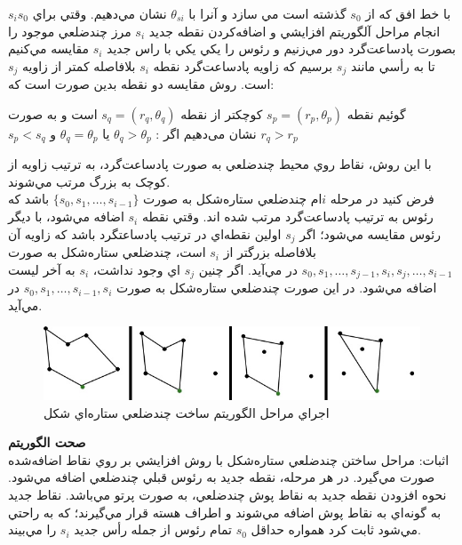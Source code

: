 \documentclass{book}
\begin{document}
$s_{i}s_{0}$
 با خط افق که از $s_{0}$ گذشته است مي سازد و آنرا با 
 $ \theta_{si}$
  نشان مي‌دهيم. وقتي براي انجام مراحل آلگوريتم افزايشي و اضافه‌کردن نقطه جديد
   $s_{i}$
  مرز چندضلعي موجود را بصورت پادساعت‌گرد دور مي‌زنيم و رئوس را يکي يکي با راس جديد 
  $s_{i}$
   مقايسه مي‌کنيم تا به رأسي مانند $s_{j}$ برسيم كه زاويه پادساعت‌گرد نقطه $s_{i}$ بلافاصله کمتر از زاويه $s_{j}$ است. روش مقايسه دو نقطه بدين صورت است که:
   \begin{center}
   	گوئیم نقطه
   	$s_{p}=(r_{p},\theta_{p})$
   	کوچکتر از نقطه
   		$s_{q}=(r_{q},\theta_{q})$
   		است و به صورت \\
   		$s_{p}<s_{q}$
   		نشان می‌دهیم اگر : 
   		$\theta_{q}>\theta_{p}$
   		یا
   		   		$\theta_{q}=\theta_{p}$
   		   		و
   		   		$r_{q}>r_{p}$
   		   		\\
   		   		   \end{center}
   		   		با اين روش، نقاط روي محيط چندضلعي به‌ صورت پادساعت‌گرد، به ترتيب زاويه از کوچک به بزرگ مرتب مي‌شوند. \\
   		   		
   		   		فرض کنيد در مرحله  $i$ام چندضلعي ستاره‌شكل به صورت
  $\{s_{0}, s_{1},\dots ,s_{i-1}\} $
   		   		   باشد که رئوس به ترتيب پادساعت‌گرد مرتب شده اند. وقتي نقطه 
   		   		   $s_{i}$
   		   		    اضافه مي‌شود، با ديگر رئوس مقايسه مي‌شود؛ اگر 
   		   		    $s_{j}$
   		   		     اولين نقطه‌اي در ترتيب پادساعتگرد باشد كه زاويه آن بلافاصله بزرگتر از 
   		   		     $s_{i}$
   		   		      است، چندضلعي ستاره‌شكل  به صورت 
   		$s_{0}, s_{1},\dots , s_{j-1}, s_{i}, s_{j}, \dots, s_{i-1}$
   		   		       در مي‌آيد. اگر چنين $s_{j}$ اي وجود نداشت، $s_{i}$ به آخر ليست اضافه مي‌شود. در اين صورت چندضلعي ستاره‌شكل  به صورت  
   		$s_{0}, s_{1},\dots ,s_{i-1}, s_{i}$
   		   		       در مي‌آيد.

 \begin{figure}[h!]
	\begin{center}
		\includegraphics{10.jpg}
		\caption{
		اجراي مراحل الگوريتم ساخت چندضلعي ستاره‌اي شکل}
	\end{center}
   	\label{شکل 10}
\end{figure}  
\textbf{صحت الگوريتم}\\
اثبات: مراحل ساختن چندضلعي ستاره‌شكل با روش افزايشي بر روي نقاط اضافه‌شده صورت مي‌گيرد. در هر مرحله، نقطه جديد به رئوس قبلي چندضلعي اضافه مي‌شود. نحوه افزودن نقطه جديد به نقاط پوش چندضلعي، به صورت پرتو مي‌باشد. نقاط جديد به گونه‌اي به نقاط پوش اضافه مي‌شوند و اطراف هسته قرار مي‌گيرند؛ که به راحتي مي‌شود ثابت کرد همواره حداقل 
$s_{0}$
 تمام رئوس از جمله رأس جديد $s_{i}$ را مي‌بيند.\\
 
\end{document}
